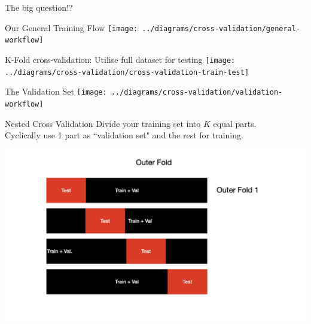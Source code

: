 \documentclass[usenames,dvipsnames]{beamer}
\begin{document}
\begin{frame}{The big question!?}
\end{frame}


\begin{frame}{Our General Training Flow}
\texttt{[image: ../diagrams/cross-validation/general-workflow]}
\end{frame}

\begin{frame}{K-Fold cross-validation: Utilise full dataset for testing}
\texttt{[image: ../diagrams/cross-validation/cross-validation-train-test]}
\end{frame}

\begin{frame}{The Validation Set}
\texttt{[image: ../diagrams/cross-validation/validation-workflow]}
\end{frame}

\begin{frame}{Nested Cross Validation}
Divide your training set into $K$ equal 	parts.\\
Cyclically use 1 part as ``validation set" and the rest for training.\\
\begin{center}
\includegraphics[scale=0.18]{./cross-validation/cross-validation.001.jpeg}
\end{center}
\end{frame}
\end{document}
